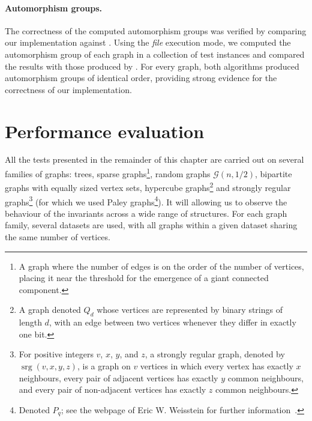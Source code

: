 \paragraph{Automorphism groups.}
The correctness of the computed automorphism groups was verified by comparing our implementation against \Naut{}. Using the \textit{file} execution mode, we computed the automorphism group of each graph in a collection of test instances and compared the results with those produced by \Naut{}. For every graph, both algorithms produced automorphism groups of identical order, providing strong evidence for the correctness of our implementation.

\newpage

\section{Performance evaluation}
All the tests presented in the remainder of this chapter are carried out on several families of graphs: trees, sparse graphs\footnote{A graph where the number of edges is on the order of the number of vertices, placing it near the threshold for the emergence of a giant connected component.}, random graphs $\mathcal{G}(n, 1/2)$, bipartite graphs with equally sized vertex sets, hypercube graphs\footnote{A graph denoted $Q_d$ whose vertices are represented by binary strings of length $d$, with an edge between two vertices whenever they differ in exactly one bit.} and strongly regular graphs\footnote{For positive integers $v$, $x$, $y$, and $z$, a strongly regular graph, denoted by $\operatorname{srg}(v,x,y,z)$, is a graph on $v$ vertices in which every vertex has exactly $x$ neighbours, every pair of adjacent vertices has exactly $y$ common neighbours, and every pair of non-adjacent vertices has exactly $z$ common neighbours.} (for which we used Paley graphs\footnote{Denoted $P_q$; see the webpage of Eric W. Weisstein for further information~\cite{WeissteinPaleyGraph}.}). It will allowing us to observe the behaviour of the invariants across a wide range of structures. For each graph family, several datasets are used, with all graphs within a given dataset sharing the same number of vertices.

